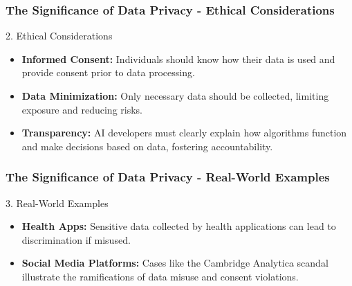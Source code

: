 \documentclass[aspectratio=169]{beamer}
\begin{document}
\begin{frame}[fragile]
    \frametitle{The Significance of Data Privacy - Ethical Considerations}
    \begin{block}{2. Ethical Considerations}
        \begin{itemize}
            \item \textbf{Informed Consent:} 
            Individuals should know how their data is used and provide consent prior to data processing.
            
            \item \textbf{Data Minimization:} 
            Only necessary data should be collected, limiting exposure and reducing risks.
            
            \item \textbf{Transparency:} 
            AI developers must clearly explain how algorithms function and make decisions based on data, fostering accountability.
        \end{itemize}
    \end{block}
\end{frame}

\begin{frame}[fragile]
    \frametitle{The Significance of Data Privacy - Real-World Examples}
    \begin{block}{3. Real-World Examples}
        \begin{itemize}
            \item \textbf{Health Apps:} 
            Sensitive data collected by health applications can lead to discrimination if misused.
            
            \item \textbf{Social Media Platforms:} 
            Cases like the Cambridge Analytica scandal illustrate the ramifications of data misuse and consent violations.
        \end{itemize}
    \end{block}
\end{frame}
\end{document}
